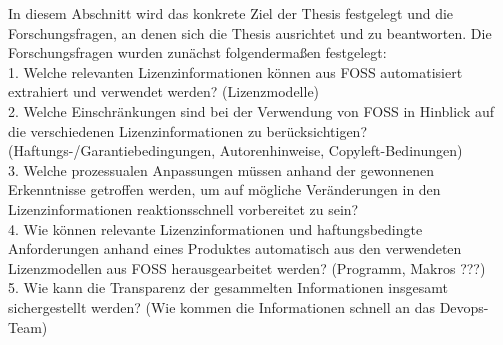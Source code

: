In diesem Abschnitt wird das konkrete Ziel der Thesis festgelegt und die Forschungsfragen, an denen sich die Thesis ausrichtet und zu beantworten. Die Forschungsfragen wurden zunächst folgendermaßen festgelegt: \\


1. Welche relevanten Lizenzinformationen können aus FOSS automatisiert extrahiert und verwendet werden? (Lizenzmodelle)\\


2. Welche Einschränkungen sind bei der Verwendung von FOSS in Hinblick auf die verschiedenen Lizenzinformationen zu berücksichtigen? (Haftungs-/Garantiebedingungen, Autorenhinweise, Copyleft-Bedinungen)\\


3. Welche prozessualen Anpassungen müssen anhand der gewonnenen Erkenntnisse getroffen werden, um auf mögliche Veränderungen in den Lizenzinformationen reaktionsschnell vorbereitet zu sein?\\ 


4. Wie können relevante Lizenzinformationen und haftungsbedingte Anforderungen anhand eines Produktes automatisch aus den verwendeten Lizenzmodellen aus FOSS herausgearbeitet werden? (Programm, Makros ???)\\


5. Wie kann die Transparenz der gesammelten Informationen insgesamt sichergestellt werden? (Wie kommen die Informationen schnell an das Devops-Team)\\ 

